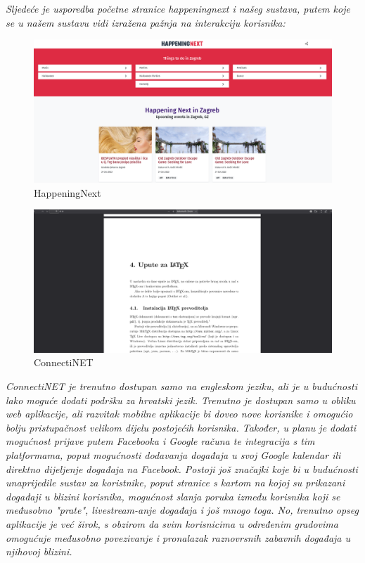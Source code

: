 		\textit{Sljedeće je usporedba početne stranice happeningnext i našeg sustava, putem koje se u našem sustavu vidi izražena pažnja na interakciju korisnika:}
		
		\begin{figure}[H]
		 	\includegraphics[scale=0.25]{slike/HappeningNext.png} 
		 	\centering
		 	\caption{HappeningNext}
		 	\label{fig:HappeningNext}
		 \end{figure}
		
		 \begin{figure}[H]
		 	\includegraphics[scale=0.25]{slike/ConnectiNET.png} 
		 	\centering
		 	\caption{ConnectiNET}
		 	\label{fig:ConnectiNET}
		 \end{figure}

		\textit{ConnectiNET je trenutno dostupan samo na engleskom jeziku, ali je u budućnosti lako moguće dodati podršku za hrvatski jezik. Trenutno je dostupan samo u obliku web aplikacije, ali razvitak mobilne aplikacije bi doveo nove korisnike i omogućio bolju pristupačnost velikom dijelu postojećih korisnika. Također, u planu je dodati mogućnost prijave putem Facebooka i Google računa te integracija s tim platformama, poput mogućnosti dodavanja događaja u svoj Google kalendar ili direktno dijeljenje događaja na Facebook. Postoji još značajki koje bi u budućnosti unaprijedile sustav za koristnike, poput stranice s kartom na kojoj su prikazani događaji u blizini korisnika, mogućnost slanja poruka između korisnika koji se međusobno "prate", livestream-anje događaja i još mnogo toga. No, trenutno opseg aplikacije je već širok, s obzirom da svim korisnicima u određenim gradovima omogućuje međusobno povezivanje i pronalazak raznovrsnih zabavnih događaja u njihovoj blizini.}

